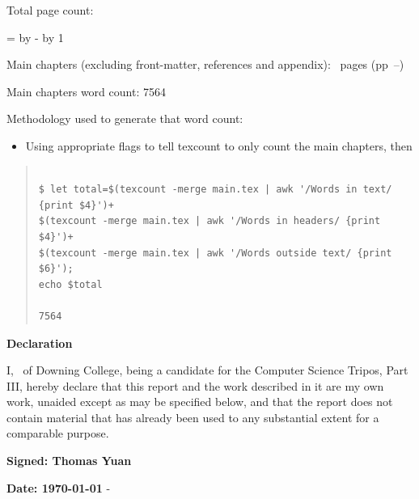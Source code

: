 \documentclass[12pt,a4paper,twoside]{report}
\newif\ifsubmission %
\newcommand{\college}{Downing College}
\newcommand{\course}{Computer Science Tripos, Part III}
\begin{document}
\begin{sffamily}
\newpage

Total page count: \pageref{lastpage}

\makeatletter
\@tempcnta=\relax%
\advance\@tempcnta by -%
\advance\@tempcnta by 1%
\xdef\contentpages{\the\@tempcnta}%
\makeatother

Main chapters (excluding front-matter, references and appendix):
\contentpages~pages
(pp~\pageref{firstcontentpage}--\pageref{lastcontentpage})

Main chapters word count: 7564

Methodology used to generate that word count:

\begin{itemize}
  \item Using appropriate flags to tell texcount to only count the main chapters, then
\end{itemize}

\begin{quote}
\begin{verbatim}

$ let total=$(texcount -merge main.tex | awk '/Words in text/ {print $4}')+
$(texcount -merge main.tex | awk '/Words in headers/ {print $4}')+
$(texcount -merge main.tex | awk '/Words outside text/ {print $6}');
echo $total

7564
\end{verbatim}
\end{quote}


\end{sffamily}

\vspace{\fill}
\onehalfspacing
\ifsubmission\else\makeatletter
\textbf{\Huge Declaration}
\vspace{40pt}

I, \@author\ of \college, being a candidate for the \course, hereby
declare that this report and the work described in it are my own work,
unaided except as may be specified below, and that the report does not
contain material that has already been used to any substantial extent
for a comparable purpose.


\bigskip 
\textbf{Signed: Thomas Yuan}

\bigskip
\textbf{Date: \today}
\vspace{\fill}
\makeatother\fi-
\end{document}
